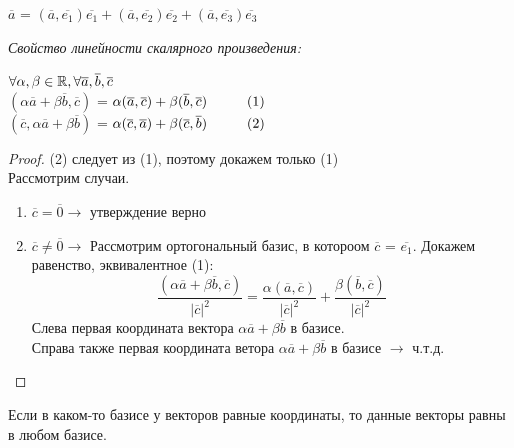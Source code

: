 \begin{center}
    $\overline{a}$ = $(\overline{a}, \overline{e_1})\overline{e_1} + (\overline{a}, \overline{e_2})\overline{e_2} + (\overline{a}, \overline{e_3})\overline{e_3}$
\end{center}

\begin{theorem}
    \textit{Свойство линейности скалярного произведения:}
    \begin{center}
        $\forall\alpha,\beta\in\mathbb{R}, \forall\overline{a}, \overline{b}, \overline{c}$\\
        $(\alpha\overline{a} + \beta\overline{b}, \overline{c})$ = $\alpha(\overline{a}, \overline{c}) + \beta(\overline{b}, \overline{c})\hspace*{1cm}(1)$\\
        $(\overline{c}, \alpha\overline{a} + \beta\overline{b})$ = $\alpha(\overline{c}, \overline{a}) + \beta(\overline{c}, \overline{b})\hspace*{1cm}(2)$
    \end{center}
\end{theorem}
\begin{proof}
    (2) следует из (1), поэтому докажем только (1)\\

    Рассмотрим случаи.
    
    \begin{enumerate}
        \item $\overline{c} = \overline{0} \longrightarrow$ утверждение верно
        \item $\overline{c} \neq \overline{0} \longrightarrow$ Рассмотрим ортогональный базис, в котороом $\overline{c}$ = $\overline{e_1}$. Докажем равенство, эквивалентное (1):
        \[
        \dfrac{(\alpha\overline{a} + \beta\overline{b}, \overline{c})}{|\overline{c}|^2} = \dfrac{\alpha(\overline{a}, \overline{c})}{|\overline{c}|^2} + \dfrac{\beta(\overline{b}, \overline{c})}{|\overline{c}|^2}
        \]
        Слева первая координата вектора $\alpha\overline{a} + \beta\overline{b}$ в базисе.\\
        Справа также первая координата ветора $\alpha\overline{a} + \beta\overline{b}$ в базисе $\longrightarrow$ ч.т.д.
    \end{enumerate}
\end{proof}

\begin{corollary}
    Если в каком-то базисе у векторов равные координаты, то данные векторы равны в любом базисе.
\end{corollary}

